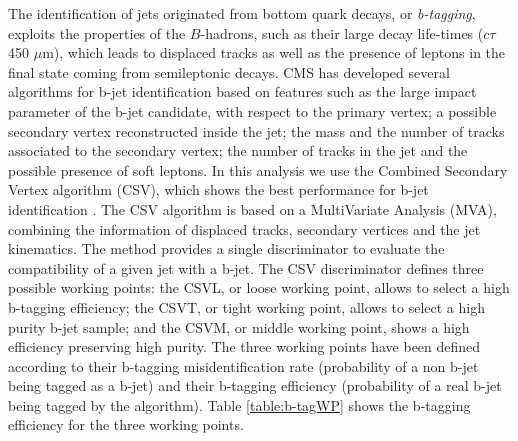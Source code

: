 The identification of jets originated from bottom quark decays, or \textit{b-tagging}, exploits 
the properties of the $B$-hadrons, such as their large decay life-times ($c\tau~$450 $\mu$m), which 
leads to displaced tracks as well as the presence of leptons in the final state 
coming from semileptonic decays. CMS has developed several algorithms for b-jet 
identification \cite{bjetID} based on features such as the large 
impact parameter of the b-jet candidate, with respect to the primary vertex;
a possible secondary vertex reconstructed inside the jet; the mass
and the number of tracks associated to the secondary vertex; the number of tracks in 
the jet and the possible presence of soft leptons. In this analysis we use the 
Combined Secondary Vertex algorithm (CSV), which shows the best 
performance for b-jet identification \cite{bjetperformance}. The CSV algorithm is based on a 
MultiVariate Analysis (MVA), combining the information
of  displaced tracks, secondary vertices and the jet kinematics. The method
provides a single discriminator to evaluate the compatibility of a given jet 
with a b-jet. The CSV discriminator defines three possible working points:
the CSVL, or loose working point, allows to select a high 
b-tagging efficiency; the CSVT, or tight working point, 
allows to select a high purity b-jet sample; and 
the CSVM, or middle working point, shows a high efficiency preserving 
high purity. The three working points have been defined 
according to their b-tagging misidentification rate (probability of a non b-jet being 
tagged as a b-jet) and their b-tagging efficiency (probability of a real b-jet being tagged 
by the algorithm). Table \ref{table:b-tagWP} shows the b-tagging efficiency for the three working points.\\

